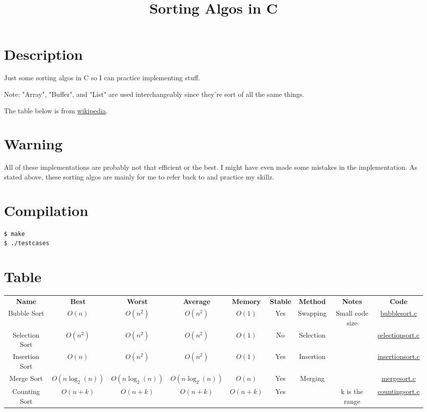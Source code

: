 \documentclass{article}
\title{Sorting Algos in C}
\date{}
\begin{document}
\maketitle
\section{Description}
Just some sorting algos in C so I can practice implementing stuff. \newline

Note: "Array", "Buffer", and "List" are used interchangeably since they're sort of all the same things. \newline

The table below is from \href{https://en.wikipedia.org/wiki/Sorting_algorithm}{wikipedia}. \newline

\section{Warning}
All of these implementations are probably not that efficient or the best. I might have even made some mistakes in the implementation.  
As stated above, these sorting algos are mainly for me to refer back to and practice my skillz.

\section{Compilation}

\begin{verbatim} 
$ make
$ ./testcases
\end{verbatim}

\section{Table}
\begin{center}
    \begin{tabular}{ |c|c|c|c|c|c|c|c|c| }
    \hline
    \textbf{Name} & \textbf{Best} & \textbf{Worst} & \textbf{Average} & \textbf{Memory} & \textbf{Stable} & \textbf{Method} & \textbf{Notes} & \textbf{Code}\\
        Bubble Sort & $O(n)$ & $O(n^2)$ & $O(n^2)$ & $O(1)$ & Yes & Swapping & Small code size & \href{bubblesort.c}{bubblesort.c} \\
        Selection Sort & $O(n^2)$ & $O(n^2)$ & $O(n^2)$ & $O(1)$ & No & Selection & & \href{selectionsort.c}{selectionsort.c} \\
        Insertion Sort & $O(n)$ & $O(n^2)$ & $O(n^2)$ & $O(1)$ & Yes & Insertion & & \href{insertionsort.c}{insertionsort.c} \\
        Merge Sort & $O(n \log_2(n))$ & $O(n \log_2(n))$ & $O(n \log_2(n)) $ & $O(n)$ & Yes & Merging & & \href{mergesort.c}{mergesort.c} \\
        Counting Sort & $O(n + k)$ & $O(n + k)$ & $O(n + k) $ & $O(n + k)$ & Yes &  & k is the range & \href{countingsort.c}{countingsort.c} \\
    \hline
\end{tabular}
\end{center}
\end{document}
